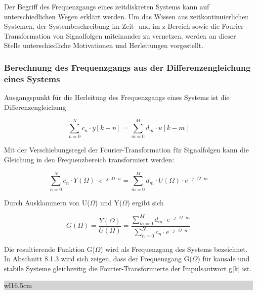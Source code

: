 \noindent Der Begriff des Frequenzgangs eines zeitdiskreten Systems kann auf unterschiedlichen Wegen erkl\"{a}rt werden. Um das Wissen aus zeitkontinuierlichen Systemen, der Systembeschreibung im Zeit- und im z-Bereich sowie die Fourier-Transformation von Signalfolgen miteinander zu vernetzen, werden an dieser Stelle unterschiedliche Motivationen und Herleitungen vorgestellt. 

\subsubsection{Berechnung des Frequenzgangs aus der Differenzengleichung eines Systems}\label{eightoneone}

\noindent Ausgangspunkt f\"{u}r die Herleitung des Frequenzgangs eines Systems ist die Differenzengleichung

\begin{equation}\label{eq:eightone}
\sum _{n=0}^{N}c_{n} \cdot y\left[k-n\right] =\sum _{m=0}^{M}d_{m} \cdot u\left[k-m\right]
\end{equation}

\noindent Mit der Verschiebungsregel der Fourier-Transformation f\"{u}r Signalfolgen kann die Gleichung in den Frequenzbereich transformiert werden:

\begin{equation}\label{eq:eighttwo}
\sum _{n=0}^{N}c_{n} \cdot Y\left(\Omega \right)\cdot e^{-j\cdot \Omega \cdot n}  =\sum _{m=0}^{M}d_{m} \cdot U\left(\Omega \right)\cdot e^{-j\cdot \Omega \cdot m}
\end{equation}

\noindent Durch Ausklammern von U($\Omega$) und Y($\Omega$) ergibt sich 

\begin{equation}\label{eq:eightthree}
G\left(\Omega \right)=\frac{Y\left(\Omega \right)}{U\left(\Omega \right)} =\frac{\sum _{m=0}^{M}d_{m} \cdot e^{-j\cdot \Omega \cdot m}}{\sum _{n=0}^{N}c_{n} \cdot e^{-j\cdot \Omega \cdot n}}
\end{equation}

\noindent Die resultierende Funktion G($\Omega$) wird als Frequenzgang des Systems bezeichnet. In Abschnitt 8.1.3 wird sich zeigen, dass der Frequenzgang G($\Omega$) f\"{u}r kausale und stabile Systeme gleichzeitig die Fourier-Transformierte der Impulsantwort g[k] ist.\bigskip

\noindent
\colorbox{lightgray}{%
%
\renewcommand\arraystretch{0.6}%
\begin{tabular}{ wl{16.5cm} }
{\selectfont{Beispiel: Rekursives Tiefpass-Filter}}
\end{tabular}%
}\medskip

